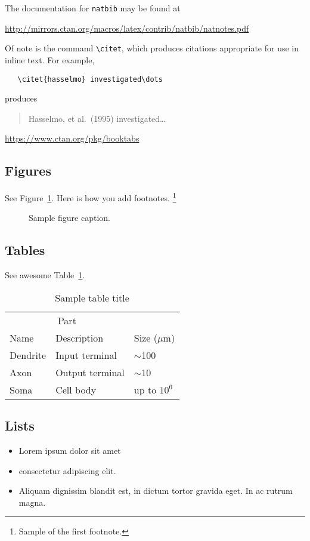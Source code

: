 \documentclass{article}
\begin{document}
  The documentation for \verb+natbib+ may be found at
  \begin{center}
    \url{http://mirrors.ctan.org/macros/latex/contrib/natbib/natnotes.pdf}
  \end{center}
  Of note is the command \verb+\citet+, which produces citations
  appropriate for use in inline text. For example,
  \begin{verbatim}
   \citet{hasselmo} investigated\dots
  \end{verbatim}
  produces
  \begin{quote}
    Hasselmo, et al.\ (1995) investigated\dots
  \end{quote}

  \begin{center}
    \url{https://www.ctan.org/pkg/booktabs}
  \end{center}

  \subsection{Figures}
  \label{subsec:figures}
  \lipsum[10]
  See Figure~\ref{fig:fig1}. Here is how you add footnotes. \footnote{Sample of the first footnote.}
  \lipsum[11]

  \begin{figure}
    \centering
    \fbox{\rule[-.5cm]{4cm}{4cm} \rule[-.5cm]{4cm}{0cm}}
    \caption{Sample figure caption.}
    \label{fig:fig1}
  \end{figure}

  \subsection{Tables}
  \label{subsec:tables}
  \lipsum[12]
  See awesome Table~\ref{tab:table}.

  \begin{table}
    \caption{Sample table title}
    \centering
    \begin{tabular}{lll}
      \toprule
      \multicolumn{2}{c}{Part} \\
      \cmidrule(r){1-2}
      Name     & Description     & Size ($\mu$m) \\
      \midrule
      Dendrite & Input terminal  & $\sim$100     \\
      Axon     & Output terminal & $\sim$10      \\
      Soma     & Cell body       & up to $10^6$  \\
      \bottomrule
    \end{tabular}
    \label{tab:table}
  \end{table}

  \subsection{Lists}
  \label{subsec:lists}
  \begin{itemize}
    \item Lorem ipsum dolor sit amet
    \item consectetur adipiscing elit.
    \item Aliquam dignissim blandit est, in dictum tortor gravida eget. In ac rutrum magna.
  \end{itemize}
\end{document}
